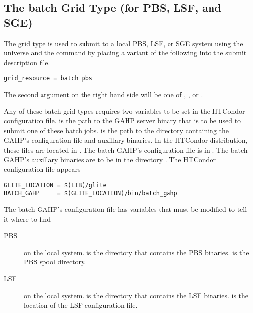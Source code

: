 \subsection{\label{sec:batch}The batch Grid Type (for PBS, LSF, and SGE) }
\label{sec:PBS}
\label{sec:LSF}
\label{sec:SGE}

The  grid type is used to submit to a local PBS, LSF, or SGE
system using the  universe and the
 command by placing a variant of the following
into the submit description file.
\begin{verbatim}
grid_resource = batch pbs
\end{verbatim}

The second argument on the right hand side will be one of
, , or .

Any of these batch grid types requires two variables to be set in the HTCondor
configuration file.
 is the path to the GAHP server binary that is to be
used to submit one of these batch jobs.
 is the path to the directory containing the GAHP's
configuration file and auxillary binaries.
In the HTCondor distribution, these files are located in 
.
The batch GAHP's configuration file is in
.
The batch GAHP's auxillary binaries
are to be in the directory .
The HTCondor configuration file appears

\footnotesize
\begin{verbatim}
GLITE_LOCATION = $(LIB)/glite
BATCH_GAHP     = $(GLITE_LOCATION)/bin/batch_gahp
\end{verbatim}
\normalsize

The batch GAHP's configuration file has variables that must be
modified to tell it where to find 
\begin{description}
\item[PBS] on the local system.
   is the directory that contains the PBS binaries.
   is the PBS spool directory.
\item[LSF] on the local system.
   is the directory that contains the LSF binaries.
   is the location of the LSF configuration file.
\end{description}

